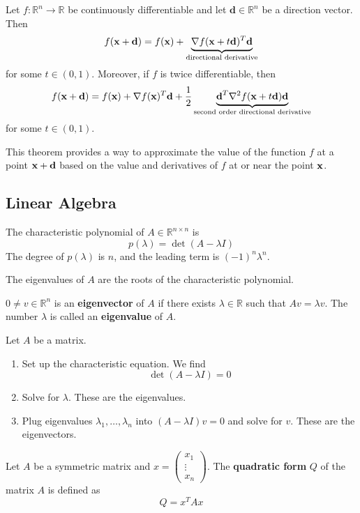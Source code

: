\begin{theorem}
  Let $f: \mathbb R^n \to \mathbb R$ be continuously differentiable and let $\textbf{d} \in \mathbb R^n$ be a direction vector. Then
  $$f(\textbf{x} + \textbf{d}) = f(\textbf{x}) + \underbrace{\nabla f(\textbf{x} + t\textbf{d})^T \textbf{d}}_{\text{directional derivative}}$$ for some $t \in (0,1)$. Moreover, if $f$ is twice differentiable, then
  $$f(\textbf{x} + \textbf{d}) = f(\textbf{x}) + \nabla f(\textbf{x})^T\textbf{d} + \frac{1}{2} \underbrace{\textbf{d}^T \nabla^2 f(\textbf{x} + t\textbf{d}) \textbf{d}}_{\text{second order directional derivative}}$$ for some $t \in (0,1)$.

  \bigskip
  This theorem provides a way to approximate the value of the function $f$ at a point $\textbf{x} + \textbf{d}$ based on the value and derivatives of $f$ at or near the point $\textbf{x}$.
\end{theorem}

\subsection{Linear Algebra}
\begin{definition}
  The characteristic polynomial of $A \in \mathbb R^{n \times n}$ is 
  $$p(\lambda) = \det(A - \lambda I)$$ The degree of $p(\lambda)$ is $n$, and the leading term is $(-1)^n \lambda^n$.

  The eigenvalues of $A$ are the roots of the characteristic polynomial.
\end{definition}
\begin{definition}
  $0 \neq v \in \mathbb R^n$ is an \textbf{eigenvector} of $A$ if there exists $\lambda \in \mathbb R$ such that $Av = \lambda v$. The number $\lambda$ is called an \textbf{eigenvalue} of $A$.
\end{definition}
\begin{theorem}
  Let $A$ be a matrix.
  \begin{enumerate}
    \item Set up the characteristic equation. We find $$\det(A - \lambda I) = 0$$
    \item Solve for $\lambda$. These are the eigenvalues.
    \item Plug eigenvalues $\lambda_1,\ldots, \lambda_n$ into $(A - \lambda I)v = 0$ and solve for $v$. These are the eigenvectors.
  \end{enumerate}
\end{theorem}
\begin{definition}
  Let $A$ be a symmetric matrix and $x = \begin{pmatrix}
      x_1 \\ \vdots \\ x_n
  \end{pmatrix}$. The \textbf{quadratic form} $Q$ of the matrix $A$ is defined as $$Q = x^T Ax$$
\end{definition}

